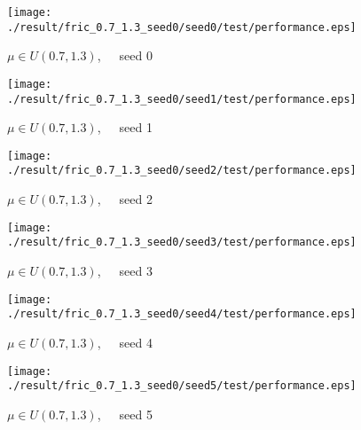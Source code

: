 \begin{figure}[p]
 \begin{minipage}{0.49\hsize}
  \begin{center}
 \texttt{[image: ./result/fric\_0.7\_1.3\_seed0/seed0/test/performance.eps]}
  \caption{$\mu\in U(0.7,1.3)$,~~~seed 0
  }
  \end{center}
 \end{minipage}
 \begin{minipage}{0.49\hsize}
   \begin{center}
 \texttt{[image: ./result/fric\_0.7\_1.3\_seed0/seed1/test/performance.eps]}
  \caption{$\mu\in U(0.7,1.3)$,~~~seed 1
  }
  \end{center}
 \end{minipage}
\end{figure}

\begin{figure}[p]
 \begin{minipage}{0.49\hsize}
  \begin{center}
 \texttt{[image: ./result/fric\_0.7\_1.3\_seed0/seed2/test/performance.eps]}
  \caption{$\mu\in U(0.7,1.3)$,~~~seed 2
  }
  \end{center}
 \end{minipage}
 \begin{minipage}{0.49\hsize}
   \begin{center}
 \texttt{[image: ./result/fric\_0.7\_1.3\_seed0/seed3/test/performance.eps]}
  \caption{$\mu\in U(0.7,1.3)$,~~~seed 3
  }
  \end{center}
 \end{minipage}
\end{figure}

\begin{figure}[p]
 \begin{minipage}{0.49\hsize}
  \begin{center}
 \texttt{[image: ./result/fric\_0.7\_1.3\_seed0/seed4/test/performance.eps]}
  \caption{$\mu\in U(0.7,1.3)$,~~~seed 4
  }
  \end{center}
 \end{minipage}
 \begin{minipage}{0.49\hsize}
   \begin{center}
 \texttt{[image: ./result/fric\_0.7\_1.3\_seed0/seed5/test/performance.eps]}
  \caption{$\mu\in U(0.7,1.3)$,~~~seed 5
  }
  \end{center}
 \end{minipage}
\end{figure}
